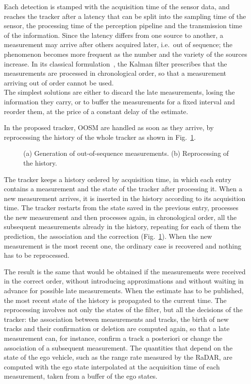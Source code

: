 Each detection is stamped with the acquisition time of the sensor data, and reaches the
tracker after a latency that can be split into the sampling time of the sensor, the processing
time of the perception pipeline and the transmission time of the information. Since the
latency differs from one source to another, a measurement may arrive after others acquired later, i.e.\ out of
sequence; the phenomenon becomes more frequent as the number and the variety of the
sources increase. In its classical formulation~\cite{kalman1960}, the Kalman filter prescribes that the measurements are
processed in chronological order, so that a measurement arriving out of order cannot be
used. \\The simplest solutions are either to discard the late
measurements, losing the information they carry, or to buffer the measurements for a
fixed interval and reorder them, at the price of a constant delay of the estimate.

In the proposed tracker, OOSM are handled as soon as they arrive, by reprocessing the
history of the whole tracker as shown in Fig.~\ref{fig:tt_oosm_timeline}.

\begin{figure}[H]
    \centering
    
    \caption{(a) Generation of out-of-sequence measurements. (b) Reprocessing of the
    history.}
    \label{fig:tt_oosm_timeline}
\end{figure}
The tracker keeps a history ordered by acquisition time, in which each entry
contains a measurement and the state of the tracker after processing it. When a new
measurement arrives, it is inserted in the history according to its acquisition time. The
tracker restarts from the state saved in the previous entry, processes the new measurement
and then processes again, in chronological order, all the subsequent measurements already
in the history, repeating for each of them the prediction, the association and the
correction (Fig.~\ref{fig:tt_oosm_timeline}). When the new measurement is the most recent
one, the ordinary case is recovered and nothing has to be reprocessed.

The result is the same that would be obtained if the measurements were received in the
correct order, without introducing approximations and without waiting in advance for
possible late measurements. When the estimate has to be published, the most recent state
of the history is propagated to the current time. The reprocessing involves not only the
states of the filter, but all the decisions of the tracker: the association between
measurements and tracks, the birth of new tracks and their confirmation or deletion are
computed again, so that a late measurement can, for instance, confirm a track a posteriori
or change the association of a subsequent measurement. The quantities that depend on the
state of the ego vehicle, such as the range rate measured by the RaDAR, are computed with
the ego state interpolated at the acquisition time of each measurement, taken from a
buffer of the ego states.


